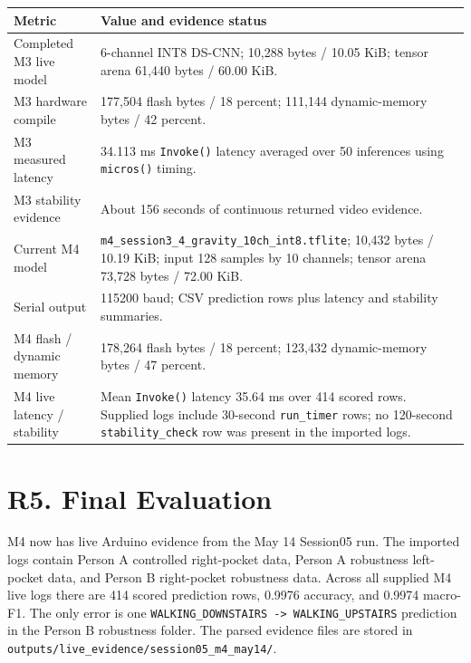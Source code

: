 \documentclass[11pt,a4paper]{article}
\begin{document}
\begin{center}
\small
\begin{tabular}{|p{4.0cm}|p{9.2cm}|}
\hline
\rowcolor{headergray}
\textbf{Metric} & \textbf{Value and evidence status}\\
\hline
Completed M3 live model & 6-channel INT8 DS-CNN; 10,288 bytes / 10.05 KiB; tensor arena 61,440 bytes / 60.00 KiB.\\
\hline
M3 hardware compile & 177,504 flash bytes / 18 percent; 111,144 dynamic-memory bytes / 42 percent.\\
\hline
M3 measured latency & 34.113 ms \texttt{Invoke()} latency averaged over 50 inferences using \texttt{micros()} timing.\\
\hline
M3 stability evidence & About 156 seconds of continuous returned video evidence.\\
\hline
Current M4 model & \texttt{m4\_session3\_4\_gravity\_10ch\_int8.tflite}; 10,432 bytes / 10.19 KiB; input 128 samples by 10 channels; tensor arena 73,728 bytes / 72.00 KiB.\\
\hline
Serial output & 115200 baud; CSV prediction rows plus latency and stability summaries.\\
\hline
M4 flash / dynamic memory & 178,264 flash bytes / 18 percent; 123,432 dynamic-memory bytes / 47 percent.\\
\hline
M4 live latency / stability & Mean \texttt{Invoke()} latency 35.64 ms over 414 scored rows. Supplied logs include 30-second \texttt{run\_timer} rows; no 120-second \texttt{stability\_check} row was present in the imported logs.\\
\hline
\end{tabular}
\end{center}
\normalsize

\section{R5. Final Evaluation}

M4 now has live Arduino evidence from the May 14 Session05 run. The imported logs contain Person A controlled right-pocket data, Person A robustness left-pocket data, and Person B right-pocket robustness data. Across all supplied M4 live logs there are 414 scored prediction rows, 0.9976 accuracy, and 0.9974 macro-F1. The only error is one \texttt{WALKING\_DOWNSTAIRS -> WALKING\_UPSTAIRS} prediction in the Person B robustness folder. The parsed evidence files are stored in \texttt{outputs/live\_evidence/session05\_m4\_may14/}.
\end{document}
